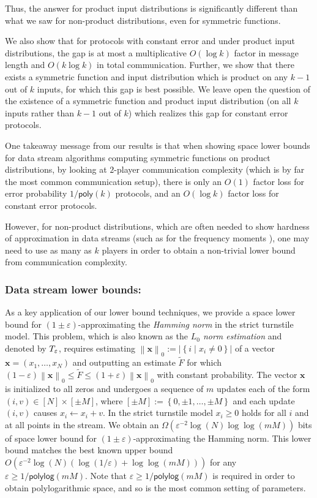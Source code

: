 \documentclass[11pt]{article}
\numberwithin{equation}{section}
\theoremstyle{definition}
\theoremstyle{plain}
\newcommand{\set}[1]{{\left \{{#1} \right \}}}
\newcommand{\norm}[1]{{\left\| {#1} \right \|}}
\newcommand{\st}{\;|\;}
\newcommand{\poly}{\mathsf{poly}}
\newcommand{\polylog}{\ensuremath{\mathsf{polylog}}}
\newcommand{\gap}{\ensuremath{\varepsilon}}
\newcommand{\bigo}[1]{\ensuremath{{{O} \left( {#1} \right)}}}
\newcommand{\bigomega}[1]{\ensuremath{{\Omega \left( {#1} \right)}}}
\newcommand{\eqdef}{\ensuremath{:=}}
\newcommand{\hest}{ \textsc{T} }
\begin{document}
Thus, the answer for product input distributions is significantly different than what we saw for non-product distributions, even for symmetric functions. 

We also show that for protocols with constant error and under product input distributions, the gap is at most a multiplicative $O(\log k)$ factor in message length and $O(k \log k)$ in total communication. Further, we show that there exists a symmetric function and input distribution which is product on any $k-1$ out of $k$ inputs, for which this gap is best possible. We leave open the question of the existence of a symmetric function and product input distribution (on all $k$ inputs rather than $k-1$ out of $k$) which realizes this gap for constant error protocols.

One takeaway message from our results is that when showing space lower bounds for data stream algorithms computing symmetric functions on product distributions, by looking at $2$-player communication complexity (which is by far the most common communication setup), there is only an $O(1)$ factor loss for error probability $1/\poly(k)$ protocols, and an $\bigo{\log k}$ factor loss for constant error protocols. 

However, for non-product distributions, which are often needed to show hardness of approximation in data streams (such as for the frequency moments \cite{BarYossef:2004eya}), one may need to use as many as $k$ players in order to obtain a non-trivial lower bound from communication complexity. 

\subsubsection{Data stream lower bounds:}
\label{para:Hamming estimation}
As a key application of our lower bound techniques, we provide a space
lower bound for $(1\pm\gap)$-approximating the \emph{Hamming norm} in the strict turnstile model.
This problem, which is also known as the \emph{$L_0$ norm estimation} and denoted by $\hest_\gap$, requires estimating $\norm{\mathbf{x}}_0  \eqdef |\set{i \st x_i \ne 0}|$ of a vector $\mathbf{x} = (x_1, \ldots, x_N)$ and outputting an estimate $\widetilde{F}$ for which $(1-\gap)\norm{\mathbf{x}}_0\le \widetilde{F} \le (1+\gap)\norm{\mathbf{x}}_0 $ with constant probability. 
The vector $\mathbf{x}$ is initialized to all zeros and undergoes a sequence of $m$ updates each of the form 
$(i,v)\in [N]\times [\pm M]$, 
where $[\pm M]\eqdef \set{0,\pm 1,\dots,\pm M}$ and each update $(i,v)$ causes $x_i\gets x_i+v$.
In the strict turnstile model $x_i \geq 0$ holds for all $i$ and at all points in the stream.
%
We obtain an $\bigomega{\gap^{-2}\log(N)\log\log(mM)}$ bits of space lower bound for  $(1\pm\gap)$-approximating the {Hamming norm}.
This lower bound matches the best known upper bound $\bigo{\gap^{-2}\log(N)\left(\log(1/\gap)+\log \log (mM)\right)}$ \cite{KNW10} for any $\gap\ge 1/\polylog(mM)$. Note that $\gap \geq 1/\polylog(mM)$ is required in order to obtain polylogarithmic space, and so is the most common setting of parameters.
\end{document}
